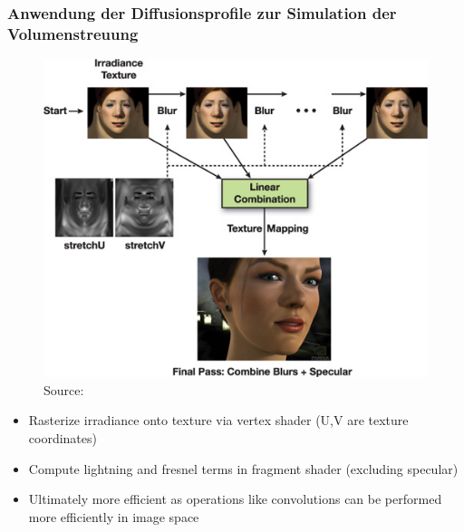 \documentclass[ngerman,runningheads,a4paper]{llncs}[2018/03/10]
\begin{document}
\subsubsection{Anwendung der Diffusionsprofile zur Simulation der Volumenstreuung}

\begin{figure}[!h]
  \centering
  \includegraphics[scale=0.6,keepaspectratio]{./images/texture-space-algorithm.jpg}
  \caption{Source: \citet{efficient-human-skin-rendering}}
\end{figure}

\begin{itemize}
  \item Rasterize irradiance onto texture via vertex shader (U,V are texture coordinates)
  \item Compute lightning and fresnel terms in fragment shader (excluding specular)
  \item Ultimately more efficient as operations like convolutions can be performed more efficiently in image space
\end{itemize}
\end{document}
